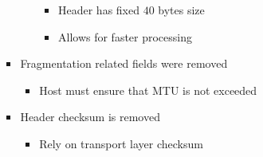 \begin{itemize}
\begin{itemize}
\begin{itemize}
\begin{itemize}
                                \begin{itemize}
                                    \item Header has fixed $40$ bytes size
                                    \item Allows for faster processing
                                \end{itemize}
                        \end{itemize}
                    \item Fragmentation related fields were removed
                        \begin{itemize}
                            \item Host must ensure that MTU is not exceeded
                        \end{itemize}
                    \item Header checksum is removed
                        \begin{itemize}
                            \item Rely on transport layer checksum
                        \end{itemize}
                \end{itemize}
        \end{itemize}
\end{itemize}
